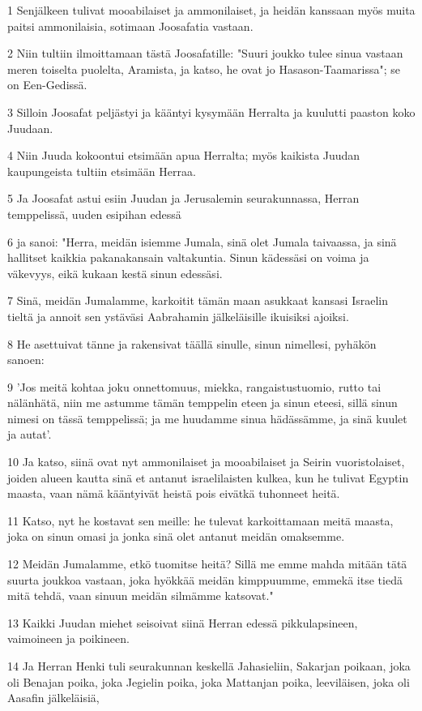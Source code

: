 \par 1 Senjälkeen tulivat mooabilaiset ja ammonilaiset, ja heidän kanssaan myös muita paitsi ammonilaisia, sotimaan Joosafatia vastaan.
\par 2 Niin tultiin ilmoittamaan tästä Joosafatille: "Suuri joukko tulee sinua vastaan meren toiselta puolelta, Aramista, ja katso, he ovat jo Hasason-Taamarissa"; se on Een-Gedissä.
\par 3 Silloin Joosafat peljästyi ja kääntyi kysymään Herralta ja kuulutti paaston koko Juudaan.
\par 4 Niin Juuda kokoontui etsimään apua Herralta; myös kaikista Juudan kaupungeista tultiin etsimään Herraa.
\par 5 Ja Joosafat astui esiin Juudan ja Jerusalemin seurakunnassa, Herran temppelissä, uuden esipihan edessä
\par 6 ja sanoi: "Herra, meidän isiemme Jumala, sinä olet Jumala taivaassa, ja sinä hallitset kaikkia pakanakansain valtakuntia. Sinun kädessäsi on voima ja väkevyys, eikä kukaan kestä sinun edessäsi.
\par 7 Sinä, meidän Jumalamme, karkoitit tämän maan asukkaat kansasi Israelin tieltä ja annoit sen ystäväsi Aabrahamin jälkeläisille ikuisiksi ajoiksi.
\par 8 He asettuivat tänne ja rakensivat täällä sinulle, sinun nimellesi, pyhäkön sanoen:
\par 9 'Jos meitä kohtaa joku onnettomuus, miekka, rangaistustuomio, rutto tai nälänhätä, niin me astumme tämän temppelin eteen ja sinun eteesi, sillä sinun nimesi on tässä temppelissä; ja me huudamme sinua hädässämme, ja sinä kuulet ja autat'.
\par 10 Ja katso, siinä ovat nyt ammonilaiset ja mooabilaiset ja Seirin vuoristolaiset, joiden alueen kautta sinä et antanut israelilaisten kulkea, kun he tulivat Egyptin maasta, vaan nämä kääntyivät heistä pois eivätkä tuhonneet heitä.
\par 11 Katso, nyt he kostavat sen meille: he tulevat karkoittamaan meitä maasta, joka on sinun omasi ja jonka sinä olet antanut meidän omaksemme.
\par 12 Meidän Jumalamme, etkö tuomitse heitä? Sillä me emme mahda mitään tätä suurta joukkoa vastaan, joka hyökkää meidän kimppuumme, emmekä itse tiedä mitä tehdä, vaan sinuun meidän silmämme katsovat."
\par 13 Kaikki Juudan miehet seisoivat siinä Herran edessä pikkulapsineen, vaimoineen ja poikineen.
\par 14 Ja Herran Henki tuli seurakunnan keskellä Jahasieliin, Sakarjan poikaan, joka oli Benajan poika, joka Jegielin poika, joka Mattanjan poika, leeviläisen, joka oli Aasafin jälkeläisiä,
